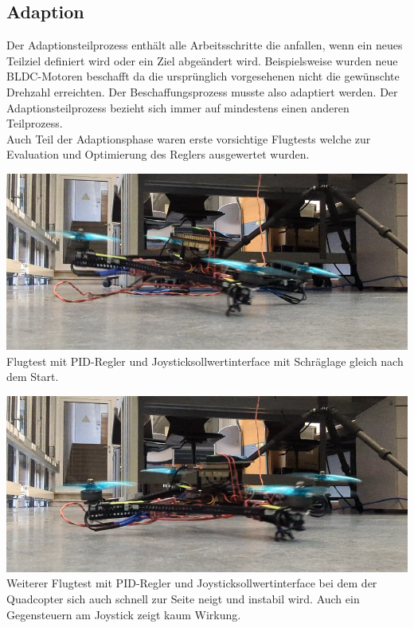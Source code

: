 \subsection{Adaption}
Der Adaptionsteilprozess enthält alle Arbeitsschritte die anfallen, wenn ein neues Teilziel definiert wird oder ein Ziel abgeändert wird. Beispielsweise wurden neue BLDC-Motoren beschafft da die ursprünglich vorgesehenen nicht die gewünschte Drehzahl erreichten. Der Beschaffungsprozess musste also adaptiert werden. Der Adaptionsteilprozess bezieht sich immer auf mindestens einen anderen Teilprozess.\\
Auch Teil der Adaptionsphase waren erste vorsichtige Flugtests welche zur Evaluation und Optimierung des Reglers ausgewertet wurden.
\begin{center}
	\includegraphics[scale=0.4]{../images/0073 Flugtest.png}{\\Flugtest mit PID-Regler und Joysticksollwertinterface mit Schräglage gleich nach dem Start.}
\end{center}
\begin{center}
	\includegraphics[scale=0.4]{../images/0074 Flugtest.png}{\\Weiterer Flugtest mit PID-Regler und Joysticksollwertinterface bei dem der Quadcopter sich auch schnell zur Seite neigt und instabil wird. Auch ein Gegensteuern am Joystick zeigt kaum Wirkung.}
\end{center}
